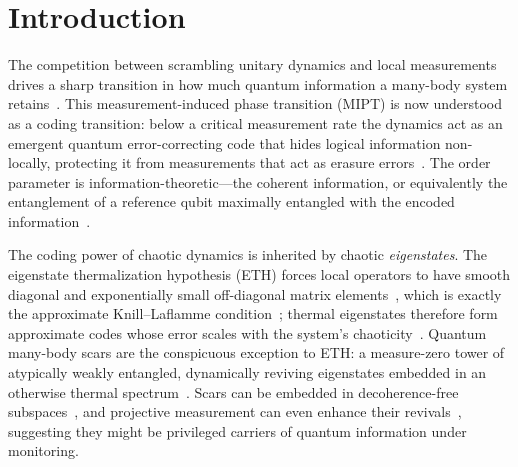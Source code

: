\documentclass[a4paper,11pt,twocolumn,unpublished]{quantumarticle}
\begin{document}
\section{Introduction}

The competition between scrambling unitary dynamics and local measurements
drives a sharp transition in how much quantum information a many-body system
retains~\cite{Li2018MIPT,Li2019,Skinner2019,Chan2019,Bao2020,Jian2020,Fisher2023}. This measurement-induced phase
transition (MIPT) is now understood as a coding transition: below a critical
measurement rate the dynamics act as an emergent quantum error-correcting code
that hides logical information non-locally, protecting it from measurements that
act as erasure errors~\cite{Choi2020,Gullans2020,Fan2021}. The order parameter
is information-theoretic---the coherent information, or equivalently the
entanglement of a reference qubit maximally entangled with the encoded
information~\cite{Gullans2020,Gullans2020b,Qian2024}.

The coding power of chaotic dynamics is inherited by chaotic \emph{eigenstates}.
The eigenstate thermalization hypothesis (ETH) forces local operators to have
smooth diagonal and exponentially small off-diagonal matrix
elements~\cite{Deutsch1991,Srednicki1994,Rigol2008,DAlessio2016}, which is
exactly the approximate Knill--Laflamme condition~\cite{KnillLaflamme1997};
thermal eigenstates therefore form approximate codes whose error scales with the
system's chaoticity~\cite{Brandao2019,BaoCheng2019,Qasim2025}. Quantum many-body scars are the
conspicuous exception to ETH: a measure-zero tower of atypically weakly
entangled, dynamically reviving eigenstates embedded in an otherwise thermal
spectrum~\cite{Bernien2017,Turner2018,Turner2018b,Serbyn2021,Moudgalya2022}.
Scars can be embedded in decoherence-free
subspaces~\cite{Zanardi1997,Lidar1998,WangDFS2024}, and projective measurement can
even enhance their revivals~\cite{Paviglianiti2025}, suggesting they might be
privileged carriers of quantum information under monitoring.
\end{document}

